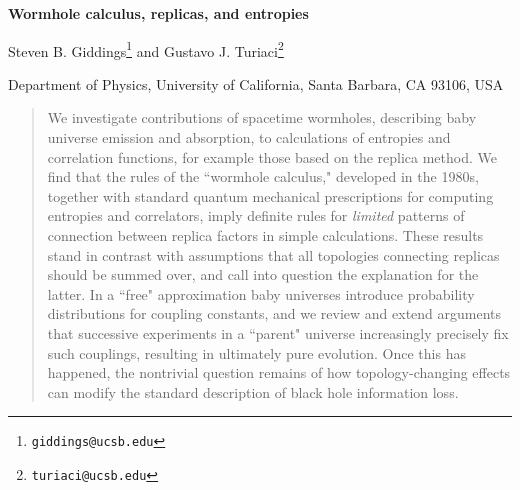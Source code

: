 \documentclass[12pt]{article}
\numberwithin{equation}{section}
\begin{document}
\thispagestyle{empty}
\begin{titlepage}
  \bigskip

  \bigskip\bigskip 




  \bigskip

\begin{center}
{\Large \bf {Wormhole calculus, replicas, and entropies }}
    \bigskip
\bigskip
\end{center}


  \begin{center}


 \rm {Steven B. Giddings\footnote{\texttt{giddings@ucsb.edu}} and Gustavo J. Turiaci\footnote{\texttt{turiaci@ucsb.edu}}}
  \bigskip \rm
\bigskip

{Department of Physics, University of California, Santa Barbara, CA 93106, USA}  \\
\rm

  \bigskip \rm
\bigskip
 
\rm


\bigskip
\bigskip



  \end{center}

   

\vspace{3cm}
  \begin{abstract}

We investigate contributions of spacetime wormholes, describing baby universe emission and absorption, to calculations of entropies and correlation functions, for example those based on the replica method.  We find that the rules of the ``wormhole calculus," developed in the 1980s, together with standard quantum mechanical prescriptions for computing entropies and correlators, imply definite rules for {\it limited} patterns of connection between replica factors in simple calculations.  These results stand in contrast with assumptions that all topologies connecting replicas should be summed over, and call into question the explanation for the latter. In a ``free" approximation baby universes introduce probability distributions for coupling constants, and we review and extend arguments that successive experiments in a ``parent" universe increasingly precisely fix such couplings, resulting in ultimately pure evolution.  Once this has happened, the nontrivial question remains of how topology-changing effects can modify the standard description of black hole information loss.
  

 \medskip
  \noindent
  \end{abstract}
\bigskip \bigskip \bigskip 

  \end{titlepage}
\end{document}
